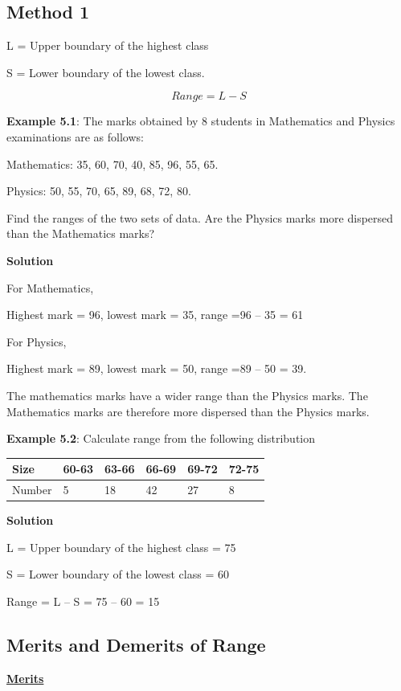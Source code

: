 \documentclass[
]{book}
\begin{document}
\subsection{Method 1}\label{method-1}

L = Upper boundary of the highest class

S = Lower boundary of the lowest class.

\[Range = L - S\]

\textbf{Example 5.1}: The marks obtained by 8 students in Mathematics and
Physics examinations are as follows:

Mathematics: 35, 60, 70, 40, 85, 96, 55, 65.

Physics: 50, 55, 70, 65, 89, 68, 72, 80.

Find the ranges of the two sets of data. Are the Physics marks more
dispersed than the Mathematics marks?

\textbf{Solution}

For Mathematics,

Highest mark = 96, lowest mark = 35, range =96 -- 35 = 61

For Physics,

Highest mark = 89, lowest mark = 50, range =89 -- 50 = 39.

The mathematics marks have a wider range than the Physics marks. The
Mathematics marks are therefore more dispersed than the Physics marks.

\textbf{Example 5.2}: Calculate range from the following distribution

\begin{longtable}[]{@{}llllll@{}}
\toprule\noalign{}
Size & 60-63 & 63-66 & 66-69 & 69-72 & 72-75 \\
\midrule\noalign{}
\endhead
\bottomrule\noalign{}
\endlastfoot
Number & 5 & 18 & 42 & 27 & 8 \\
\end{longtable}

\textbf{Solution}

L = Upper boundary of the highest class = 75

S = Lower boundary of the lowest class = 60

Range = L -- S = 75 -- 60 = 15

\subsection{Merits and Demerits of Range}\label{merits-and-demerits-of-range}

\ul{\textbf{Merits}}
\end{document}
